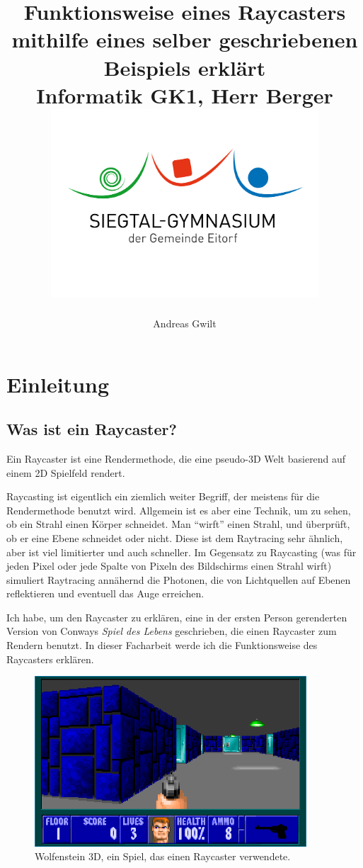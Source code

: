 \documentclass[a4paper,12pt]{report}
\title{{Funktionsweise eines Raycasters mithilfe eines selber geschriebenen Beispiels erkl\"art \vspace{1cm}} \\
        {\large Informatik GK1, Herr Berger} \\
        {\includegraphics[width=10cm]{sge.jpg}}}
\author{Andreas Gwilt}
\newcommand{\mychapter}[2]{
    \setcounter{chapter}{#1}
    \setcounter{section}{0}
    \chapter*{#2}
    \addcontentsline{toc}{chapter}{#2}
}
\begin{document}
\maketitle
\tableofcontents

\setcounter{page}{0}

\mychapter{1}{Einleitung}

\section{Was ist ein Raycaster?}
Ein Raycaster ist eine Rendermethode, die eine pseudo-3D Welt basierend auf einem 2D Spielfeld rendert\cite{scratch}.

Raycasting ist eigentlich ein ziemlich weiter Begriff, der meistens für die Rendermethode benutzt wird. Allgemein ist es aber eine Technik, um zu sehen, ob ein Strahl einen Körper schneidet. Man ``wirft'' einen Strahl, und überprüft, ob er eine Ebene schneidet oder nicht. Diese ist dem Raytracing sehr ähnlich, aber ist viel limitierter und auch schneller. Im Gegensatz zu Raycasting (was für jeden Pixel oder jede Spalte von Pixeln des Bildschirms einen Strahl wirft) simuliert Raytracing annähernd die Photonen, die von Lichtquellen auf Ebenen reflektieren und eventuell das Auge erreichen.

Ich habe, um den Raycaster zu erklären, eine in der ersten Person gerenderten Version von Conways \textit{Spiel des Lebens}\cite{life} geschrieben, die einen Raycaster zum Rendern benutzt. In dieser Facharbeit werde ich die Funktionsweise des Raycasters erklären.

\begin{figure}[htbp] 
        \centering
        \includegraphics[width=4in]{wolf3d.png} 
        \caption{Wolfenstein 3D, ein Spiel, das einen Raycaster verwendete.}
        \label{fig:wolf3d}
\end{figure}
\end{document}
